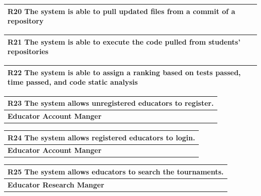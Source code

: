 \documentclass[12pt, a4paper]{report}
\begin{document}
\begin{table}[H]
    \begin{tabularx}{\textwidth}{X}
    \textbf{R20} The system is able to pull updated files from a commit of a repository\\
    \hline 
    \end{tabularx}
\end{table}

\begin{table}[H]
    \begin{tabularx}{\textwidth}{X}
    \textbf{R21} The system is able to execute the code pulled from students' repositories\\
    \hline 
    \end{tabularx}
\end{table}

\begin{table}[H]
    \begin{tabularx}{\textwidth}{X}
    \textbf{R22} The system is able to assign a ranking based on tests passed, time passed, and code static analysis\\
    \hline 
    \end{tabularx}
\end{table}

\begin{table}[H]
    \begin{tabularx}{\textwidth}{X}
    \textbf{R23} The system allows unregistered educators to register.\\
    \hline 
    \textbf{Educator Account Manger}
\end{tabularx}
\end{table}

\begin{table}[H]
    \begin{tabularx}{\textwidth}{X}
    \textbf{R24} The system allows registered educators to login.\\
    \hline 
    \textbf{Educator Account Manger}
\end{tabularx}
\end{table}

\begin{table}[H]
    \begin{tabularx}{\textwidth}{X}
    \textbf{R25} The system allows educators to search the tournaments.\\
    \hline 
    \textbf{Educator Research Manger}
\end{tabularx}
\end{table}
\end{document}
